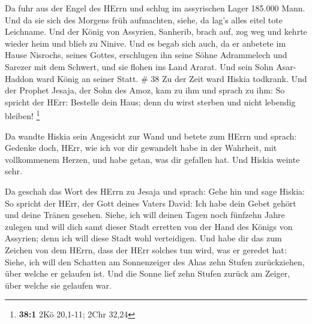  Da fuhr aus der Engel des HErrn und schlug im assyrischen
Lager 185.000 Mann. Und da sie sich des Morgens früh aufmachten, siehe,
da lag's alles eitel tote Leichname.  Und der König von
Assyrien, Sanherib, brach auf, zog weg und kehrte wieder heim und blieb
zu Ninive.  Und es begab sich auch, da er anbetete im Hause
Nisrochs, seines Gottes, erschlugen ihn seine Söhne Adrammelech und
Sarezer mit dem Schwert, und sie flohen ins Land Ararat. Und sein Sohn
Asar-Haddon ward König an seiner Statt. \# 38  Zu der Zeit
ward Hiskia todkrank. Und der Prophet Jesaja, der Sohn des Amoz, kam zu
ihm und sprach zu ihm: So spricht der HErr: Bestelle dein Haus; denn du
wirst sterben und nicht lebendig bleiben! \footnote{\textbf{38:1} 2Kö
  20,1-11; 2Chr 32,24}

 Da wandte Hiskia sein Angesicht zur Wand und betete zum
HErrn  und sprach: Gedenke doch, HErr, wie ich vor dir
gewandelt habe in der Wahrheit, mit vollkommenem Herzen, und habe getan,
was dir gefallen hat. Und Hiskia weinte sehr.

 Da geschah das Wort des HErrn zu Jesaja und sprach:
 Gehe hin und sage Hiskia: So spricht der HErr, der Gott
deines Vaters David: Ich habe dein Gebet gehört und deine Tränen
gesehen. Siehe, ich will deinen Tagen noch fünfzehn Jahre zulegen
 und will dich samt dieser Stadt erretten von der Hand des
Königs von Assyrien; denn ich will diese Stadt wohl verteidigen.
 Und habe dir das zum Zeichen von dem HErrn, dass der HErr
solches tun wird, was er geredet hat:  Siehe, ich will den
Schatten am Sonnenzeiger des Ahas zehn Stufen zurückziehen, über welche
er gelaufen ist. Und die Sonne lief zehn Stufen zurück am Zeiger, über
welche sie gelaufen war.

